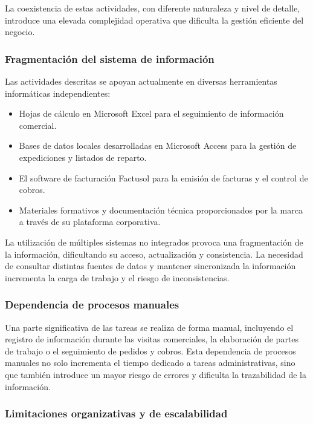 La coexistencia de estas actividades, con diferente naturaleza y nivel de detalle, introduce una elevada complejidad operativa que dificulta la gestión eficiente del negocio.

\subsubsection{Fragmentación del sistema de información}

Las actividades descritas se apoyan actualmente en diversas herramientas informáticas independientes:

\begin{itemize}
  \item Hojas de cálculo en Microsoft Excel para el seguimiento de información comercial.
  \item Bases de datos locales desarrolladas en Microsoft Access para la gestión de expediciones y listados de reparto.
  \item El software de facturación Factusol para la emisión de facturas y el control de cobros.
  \item Materiales formativos y documentación técnica proporcionados por la marca a través de su plataforma corporativa.
\end{itemize}

La utilización de múltiples sistemas no integrados provoca una fragmentación de la información, dificultando su acceso, actualización y consistencia. La necesidad de consultar distintas fuentes de datos y mantener sincronizada la información incrementa la carga de trabajo y el riesgo de inconsistencias.

\subsubsection{Dependencia de procesos manuales}

Una parte significativa de las tareas se realiza de forma manual, incluyendo el registro de información durante las visitas comerciales, la elaboración de partes de trabajo o el seguimiento de pedidos y cobros. Esta dependencia de procesos manuales no solo incrementa el tiempo dedicado a tareas administrativas, sino que también introduce un mayor riesgo de errores y dificulta la trazabilidad de la información.

\subsubsection{Limitaciones organizativas y de escalabilidad}

